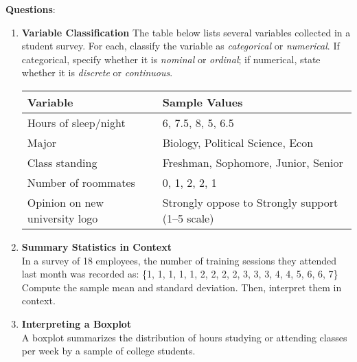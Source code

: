 \documentclass{article}
\begin{document}
\textbf{Questions}:
\begin{enumerate}
    \item \textbf{Variable Classification}
    The table below lists several variables collected in a student survey. For each, classify the variable as \emph{categorical} or \emph{numerical}. If categorical, specify whether it is \emph{nominal} or \emph{ordinal}; if numerical, state whether it is \emph{discrete} or \emph{continuous}.

    \begin{center}
    \begin{tabular}{|l|l|}
    \hline
    \textbf{Variable} & \textbf{Sample Values} \\
    \hline
    Hours of sleep/night & 6, 7.5, 8, 5, 6.5 \\
    Major & Biology, Political Science, Econ \\
    Class standing & Freshman, Sophomore, Junior, Senior \\
    Number of roommates & 0, 1, 2, 2, 1 \\
    Opinion on new university logo & Strongly oppose to Strongly support (1--5 scale) \\
    \hline
    \end{tabular}
    \end{center}

    \item \textbf{Summary Statistics in Context} \\
    In a survey of 18 employees, the number of training sessions they attended last month was recorded as:
    \{1, 1, 1, 1, 1, 2, 2, 2, 2, 3, 3, 3, 4, 4, 5, 6, 6, 7\} \\
    Compute the sample mean and standard deviation. Then, interpret them in context.

    \item \textbf{Interpreting a Boxplot} \\
    A boxplot summarizes the distribution of hours studying or attending classes per week by a sample of college students.

\begin{center}
\end{center}
\end{enumerate}
\end{document}
